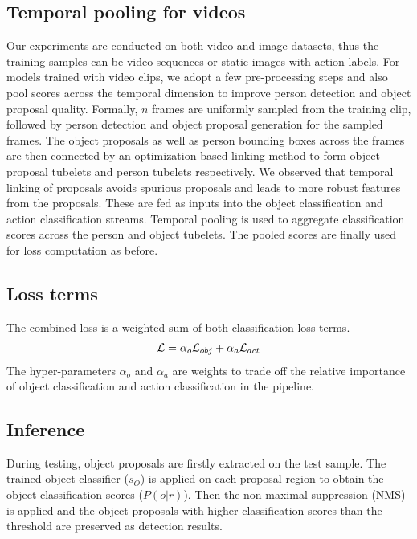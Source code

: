 \documentclass[10pt,twocolumn,letterpaper]{article}
\begin{document}
\subsection{Temporal pooling for videos}
\vspace{-0.3\baselineskip}
Our experiments are conducted on both video and image datasets, thus the training samples can be video sequences or static images with action labels. For models trained with video clips, we adopt a few pre-processing steps and also pool scores across the temporal dimension to improve person detection and object proposal quality. Formally, $n$ frames are uniformly sampled from the training clip, followed by person detection and object proposal generation for the sampled frames. The object proposals as well as person bounding boxes across the frames are then connected by an optimization based linking method \cite{gkioxari2015finding,yang2017spatio} to form object proposal tubelets and person tubelets respectively. We observed that temporal linking of proposals avoids spurious proposals and leads to more robust features from the proposals. These are fed as inputs into the object classification and action classification streams. Temporal pooling is used to aggregate classification scores across the person and object tubelets. The pooled scores are finally used for loss computation as before. 
\vspace{-0.4\baselineskip}
\subsection{Loss terms}
\vspace{-0.4\baselineskip}
The combined loss is a weighted sum of both classification loss terms.
\vspace{-0.3\baselineskip}
\begin{align}
\label{eqn:final_loss_term}
{\mathcal L} = \alpha_o{\mathcal L}_{obj} + \alpha_a{\mathcal L}_{act}
\end{align}
The hyper-parameters $\alpha_o$ and $\alpha_a$ are weights to trade off the relative importance of object classification and action classification in the pipeline.
\vspace{-0.5\baselineskip}
\subsection{Inference}
\vspace{-0.5\baselineskip}
During testing, object proposals are firstly extracted on the test sample. The trained object classifier ($s_O$) is applied on each proposal region to obtain the object classification scores ($P(o|r)$). Then the non-maximal suppression (NMS) is applied and the object proposals with higher classification scores than the threshold are preserved as detection results.
\end{document}
